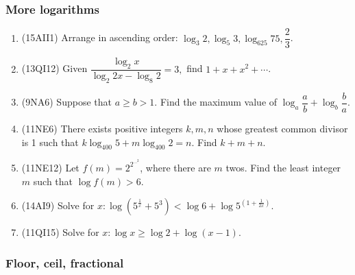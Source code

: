 \documentclass[10pt,paper=letter]{scrartcl}
\begin{document}
\subsubsection*{More logarithms}

\begin{enumerate}



\item (15AII1) Arrange in ascending order: $\log_3 2, \log_5 3, \log_{625} 75, \dfrac{2}{3}$.

\item (13QI12) Given $\dfrac{\log_2 x}{\log_2 2x - \log_8 2} = 3,$ find $1 + x + x^2 + \cdots$.


\item (9NA6) Suppose that $a \geq b > 1$. Find the maximum value of $\log_a \dfrac{a}{b} + \log_b \dfrac{b}{a}$.

\item (11NE6) There exists positive integers $k, m, n$ whose greatest common divisor is 1 such that $k\log_{400} 5 + m\log_{400} 2 = n$. Find $k + m + n$.

\item (11NE12) Let $f(m) = 2^{2^{\cdots^{2}}}$, where there are $m$ twos. Find the least integer $m$ such that $\log f(m) > 6$.

\item (14AI9) Solve for $x: \log(5^{\frac{1}{x}} + 5^3) < \log 6 + \log 5^{\left(1 + \frac{1}{2x}\right)}$.

\item (11QI15) Solve for $x: \log x \geq \log 2 + \log(x-1)$.

\end{enumerate}

\subsubsection*{Floor, ceil, fractional}
\end{document}

